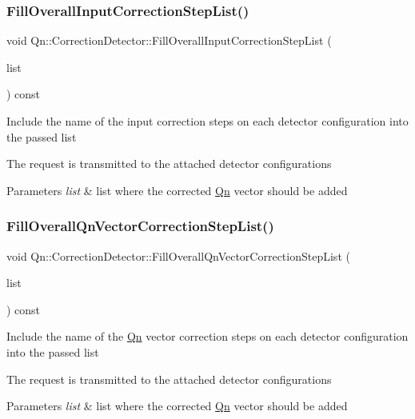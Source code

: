 \subsubsection{\texorpdfstring{Fill\+Overall\+Input\+Correction\+Step\+List()}{FillOverallInputCorrectionStepList()}}
{\footnotesize\ttfamily void Qn\+::\+Correction\+Detector\+::\+Fill\+Overall\+Input\+Correction\+Step\+List (\begin{DoxyParamCaption}\item[{T\+List $\ast$}]{list }\end{DoxyParamCaption}) const}

Include the name of the input correction steps on each detector configuration into the passed list

The request is transmitted to the attached detector configurations 
\begin{DoxyParams}{Parameters}
{\em list} & list where the corrected \mbox{\hyperlink{namespaceQn}{Qn}} vector should be added \\
\hline
\end{DoxyParams}
\mbox{\label{classQn_1_1CorrectionDetector_a5a6b9787279e397b1682e72038acd3fe}} 
\subsubsection{\texorpdfstring{Fill\+Overall\+Qn\+Vector\+Correction\+Step\+List()}{FillOverallQnVectorCorrectionStepList()}}
{\footnotesize\ttfamily void Qn\+::\+Correction\+Detector\+::\+Fill\+Overall\+Qn\+Vector\+Correction\+Step\+List (\begin{DoxyParamCaption}\item[{T\+List $\ast$}]{list }\end{DoxyParamCaption}) const}

Include the name of the \mbox{\hyperlink{namespaceQn}{Qn}} vector correction steps on each detector configuration into the passed list

The request is transmitted to the attached detector configurations 
\begin{DoxyParams}{Parameters}
{\em list} & list where the corrected \mbox{\hyperlink{namespaceQn}{Qn}} vector should be added \\
\hline
\end{DoxyParams}
\mbox{\label{classQn_1_1CorrectionDetector_a5b4d3b18be6dd94a86e56d838c42ca80}} 
